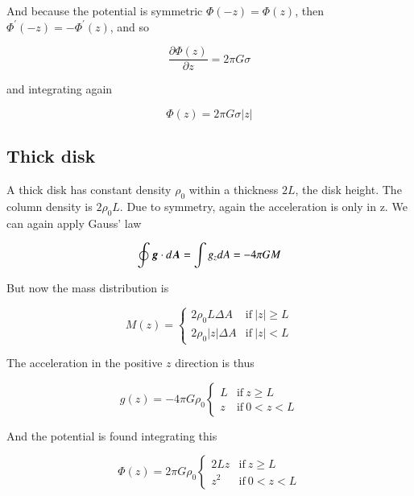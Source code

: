 And because the potential is symmetric $\varPhi(-z) = \varPhi(z)$, then $\varPhi^\prime(-z) = -\varPhi^\prime(z)$, and so 

\begin{equation}
\frac{\partial \varPhi(z)}{\partial z} = 2\pi G \sigma 
\end{equation}

and integrating again 

\begin{equation}
\boxed{\varPhi(z)  = 2\pi G \sigma |z|}
\end{equation}


\subsection{Thick disk}

A thick disk has constant density $\rho_0$ within a thickness $2L$, the disk height. The column density is $2\rho_0 L$. Due to symmetry, again the acceleration is only in z. We can again apply Gauss' law 

\begin{equation}
\oint {\boldsymbol{g}} \cdot d{\boldsymbol{A}} = \int g_z dA =  -4\pi G M 
\end{equation}

But now the mass distribution is 

\begin{equation}
M(z) = \left\{ \begin{array}{cc} 
2\rho_0 L  \Delta A & \mathrm{if} \ |z| \geq L \\
2\rho_0 |z| \Delta A  & \mathrm{if} \ |z| < L
\end{array} \right.
\end{equation}

The acceleration in the positive $z$ direction is thus 

\begin{equation}
g(z) = -4\pi G \rho_0 \left\{ \begin{array}{cc} 
L & \mathrm{if} \ z \geq L \\
z & \mathrm{if} \ 0 < z < L
\end{array} \right.
\end{equation}

And the potential is found integrating this 


\begin{equation}
\varPhi(z) = 2\pi G \rho_0 \left\{ \begin{array}{cc} 
2Lz & \mathrm{if} \ z \geq L \\
z^2  & \mathrm{if} \ 0 < z < L
\end{array} \right.
\end{equation}


